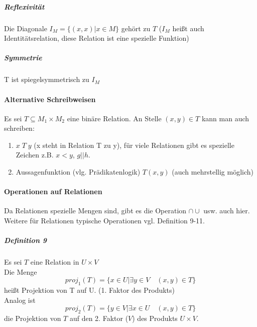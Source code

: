 \documentclass[a4paper]{scrartcl}
\begin{document}
\subparagraph{Reflexivität} Die Diagonale $I_M = \{(x,x) \vert x\in M\}$ gehört zu $T$ ($I_M$ heißt auch Identitätsrelation, diese Relation ist eine spezielle Funktion)
\subparagraph{Symmetrie}T ist spiegelsymmetrisch zu $I_M$

\paragraph{Alternative Schreibweisen}
Es sei $T \subseteq M_1 \times M_2$ eine binäre Relation. An Stelle $(x,y) \in T$ kann man auch schreiben:
\begin{enumerate}
\item $x \; T \; y$
(x steht in Relation T zu y), für viele Relationen gibt es spezielle Zeichen z.B. $x < y$, $g || h$.
\item Aussagenfunktion (vlg. Prädikatenlogik) $T(x,y)$ (auch mehrstellig möglich) 
\end{enumerate}

\paragraph{Operationen auf Relationen}

Da Relationen spezielle Mengen sind, gibt es die Operation $\cap \cup$ usw. auch hier. Weitere für Relationen typische Operationen vgl. Definition 9-11.

\subparagraph{Definition 9} Es sei $T$ eine Relation in $U\times V$\\
Die Menge
\[proj_1 (T) = \{ x \in U | \exists y\in V \quad (x,y) \in T\}\]
heißt Projektion von T auf U. (1. Faktor des Produkts)\\
Analog ist
\[ proj_2 (T) = \{ y \in V | \exists x \in U \quad (x,y) \in T\}\]
die Projektion von $T$ auf den 2. Faktor ($V$) des Produkts $U\times V$.
\end{document}
